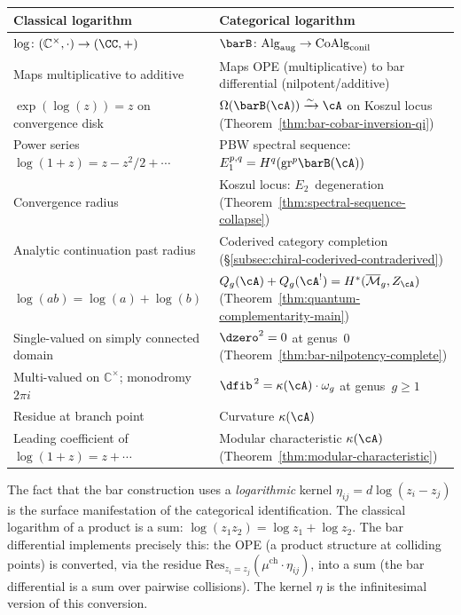 \begin{center}
\small
\renewcommand{\arraystretch}{1.3}
\begin{tabular}{p{5.5cm}p{5.5cm}}
\textbf{Classical logarithm} & \textbf{Categorical logarithm} \\
\hline
$\log \colon (\mathbb{C}^\times, \cdot) \to (\CC, +)$ &
$\barB \colon \mathrm{Alg}_{\mathrm{aug}} \to \mathrm{CoAlg}_{\mathrm{conil}}$ \\[2pt]
Maps multiplicative to additive &
Maps OPE (multiplicative) to bar differential (nilpotent/additive) \\[2pt]
$\exp(\log(z)) = z$ on convergence disk &
$\Omega(\barB(\cA)) \xrightarrow{\sim} \cA$ on Koszul locus
(Theorem~\ref{thm:bar-cobar-inversion-qi}) \\[2pt]
Power series $\log(1+z) = z - z^2/2 + \cdots$ &
PBW spectral sequence:
$E_1^{p,q} = H^q(\mathrm{gr}^p \barB(\cA))$ \\[2pt]
Convergence radius &
Koszul locus: $E_2$~degeneration
(Theorem~\ref{thm:spectral-sequence-collapse}) \\[2pt]
Analytic continuation past radius &
Coderived category completion
(\S\ref{subsec:chiral-coderived-contraderived}) \\[2pt]
$\log(ab) = \log(a) + \log(b)$ &
$Q_g(\cA) + Q_g(\cA^!) = H^*(\overline{\mathcal{M}}_g, Z_\cA)$
(Theorem~\ref{thm:quantum-complementarity-main}) \\[2pt]
Single-valued on simply connected domain &
$\dzero^2 = 0$ at genus~$0$
(Theorem~\ref{thm:bar-nilpotency-complete}) \\[2pt]
Multi-valued on $\mathbb{C}^\times$; monodromy $2\pi i$ &
$\dfib^{\,2} = \kappa(\cA) \cdot \omega_g$ at genus~$g \geq 1$ \\[2pt]
Residue at branch point &
Curvature $\kappa(\cA)$ \\[2pt]
Leading coefficient of $\log(1+z) = z + \cdots$ &
Modular characteristic $\kappa(\cA)$
(Theorem~\ref{thm:modular-characteristic})
\end{tabular}
\end{center}

\begin{remark}
\label{rem:logarithmic-kernel}
The fact that the bar construction uses a \emph{logarithmic} kernel
$\eta_{ij} = d\log(z_i - z_j)$ is the surface manifestation of the
categorical identification.  The classical logarithm of a product is a
sum: $\log(z_1 z_2) = \log z_1 + \log z_2$.  The bar differential
implements precisely this: the OPE (a product structure at colliding
points) is converted, via the residue $\mathrm{Res}_{z_i = z_j}
(\mu^{\mathrm{ch}} \cdot \eta_{ij})$, into a sum (the bar
differential is a sum over pairwise collisions).  The kernel $\eta$ is
the infinitesimal version of this conversion.
\end{remark}

